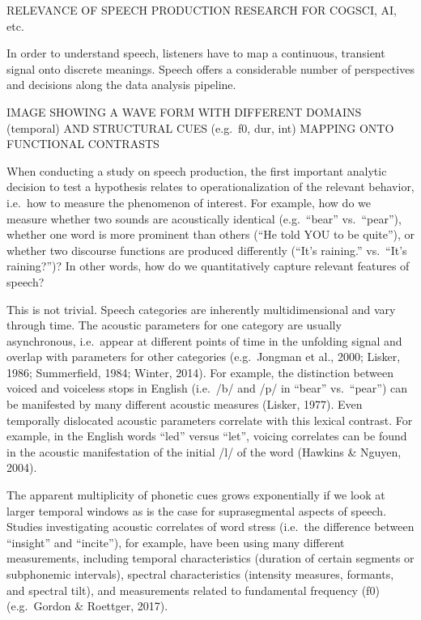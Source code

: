 \documentclass[
  english,
  man]{apa6}
\begin{document}
RELEVANCE OF SPEECH PRODUCTION RESEARCH FOR COGSCI, AI, etc.

In order to understand speech, listeners have to map a continuous, transient signal onto discrete meanings.
Speech offers a considerable number of perspectives and decisions along the data analysis pipeline.

IMAGE SHOWING A WAVE FORM WITH DIFFERENT DOMAINS (temporal) AND STRUCTURAL CUES (e.g.~f0, dur, int) MAPPING ONTO FUNCTIONAL CONTRASTS

When conducting a study on speech production, the first important analytic decision to test a hypothesis relates to operationalization of the relevant behavior, i.e.~how to measure the phenomenon of interest.
For example, how do we measure whether two sounds are acoustically identical (e.g.~\enquote{bear} vs.~\enquote{pear}), whether one word is more prominent than others (\enquote{He told YOU to be quite}), or whether two discourse functions are produced differently (\enquote{It's raining.} vs.~\enquote{It's raining?})?
In other words, how do we quantitatively capture relevant features of speech?

This is not trivial.
Speech categories are inherently multidimensional and vary through time.
The acoustic parameters for one category are usually asynchronous, i.e.~appear at different points of time in the unfolding signal and overlap with parameters for other categories (e.g.~Jongman et al., 2000; Lisker, 1986; Summerfield, 1984; Winter, 2014).
For example, the distinction between voiced and voiceless stops in English (i.e.~/b/ and /p/ in \enquote{bear} vs.~\enquote{pear}) can be manifested by many different acoustic measures (Lisker, 1977).
Even temporally dislocated acoustic parameters correlate with this lexical contrast.
For example, in the English words \enquote{led} versus \enquote{let}, voicing correlates can be found in the acoustic manifestation of the initial /l/ of the word (Hawkins \& Nguyen, 2004).

The apparent multiplicity of phonetic cues grows exponentially if we look at larger temporal windows as is the case for suprasegmental aspects of speech.
Studies investigating acoustic correlates of word stress (i.e.~the difference between \enquote{insight} and \enquote{incite}), for example, have been using many different measurements, including temporal characteristics (duration of certain segments or subphonemic intervals), spectral characteristics (intensity measures, formants, and spectral tilt), and measurements related to fundamental frequency (f0) (e.g.~Gordon \& Roettger, 2017).
\end{document}
